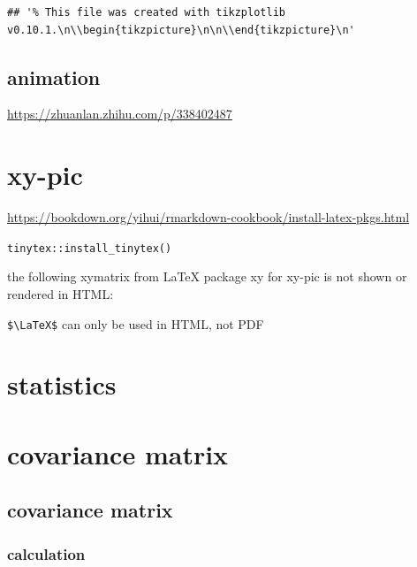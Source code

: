 \documentclass[
]{book}
\theoremstyle{definition}
\theoremstyle{definition}
\theoremstyle{definition}
\theoremstyle{definition}
\theoremstyle{remark}
\begin{document}
\begin{verbatim}
## '% This file was created with tikzplotlib v0.10.1.\n\\begin{tikzpicture}\n\n\\end{tikzpicture}\n'
\end{verbatim}

\section{animation}\label{animation}

\url{https://zhuanlan.zhihu.com/p/338402487}

\chapter{xy-pic}\label{xy-pic}

\url{https://bookdown.org/yihui/rmarkdown-cookbook/install-latex-pkgs.html}

\texttt{tinytex::install\_tinytex()}

the following xymatrix from LaTeX package xy for xy-pic is not shown or rendered in HTML:

\texttt{\$\textbackslash{}LaTeX\$} can only be used in HTML, not PDF


\chapter{statistics}\label{statistics}

\chapter{covariance matrix}\label{covariance-matrix}

\section{covariance matrix}\label{covariance-matrix-1}

\textsuperscript{}

\subsection{calculation}\label{calculation}
\end{document}
